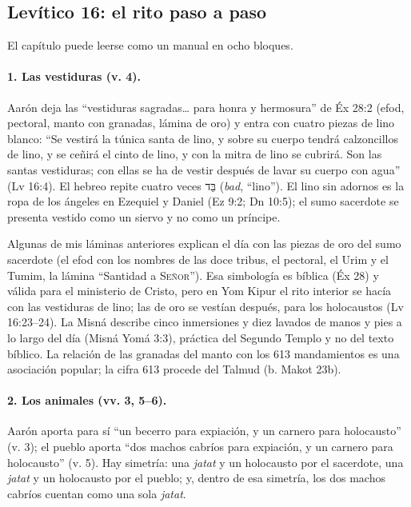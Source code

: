 \documentclass[11pt,letterpaper]{article}
\newcommand{\heb}[1]{\mbox{\foreignlanguage{hebrew}{#1}}}
\newcommand{\SENOR}{\textsc{Señor}}
\begin{document}
\subsection{Levítico 16: el rito paso a paso}
El capítulo puede leerse como un manual en ocho bloques.

\paragraph{1. Las vestiduras (v. 4).} Aarón deja las ``vestiduras sagradas\ldots{} para honra y hermosura'' de Éx 28:2 (efod, pectoral, manto con granadas, lámina de oro) y entra con cuatro piezas de lino blanco: ``Se vestirá la túnica santa de lino, y sobre su cuerpo tendrá calzoncillos de lino, y se ceñirá el cinto de lino, y con la mitra de lino se cubrirá. Son las santas vestiduras; con ellas se ha de vestir después de lavar su cuerpo con agua'' (Lv 16:4). El hebreo repite cuatro veces \heb{בַּד} (\emph{bad}, ``lino''). El lino sin adornos es la ropa de los ángeles en Ezequiel y Daniel (Ez 9:2; Dn 10:5); el sumo sacerdote se presenta vestido como un siervo y no como un príncipe.

\begin{nota}
Algunas de mis láminas anteriores explican el día con las piezas de oro del sumo sacerdote (el efod con los nombres de las doce tribus, el pectoral, el Urim y el Tumim, la lámina ``Santidad a \SENOR''). Esa simbología es bíblica (Éx 28) y válida para el ministerio de Cristo, pero en Yom Kipur el rito interior se hacía con las vestiduras de lino; las de oro se vestían después, para los holocaustos (Lv 16:23--24). La Misná describe cinco inmersiones y diez lavados de manos y pies a lo largo del día (Misná Yomá 3:3), práctica del Segundo Templo y no del texto bíblico. La relación de las granadas del manto con los 613 mandamientos es una asociación popular; la cifra 613 procede del Talmud (b. Makot 23b).
\end{nota}

\paragraph{2. Los animales (vv. 3, 5--6).} Aarón aporta para sí ``un becerro para expiación, y un carnero para holocausto'' (v. 3); el pueblo aporta ``dos machos cabríos para expiación, y un carnero para holocausto'' (v. 5). Hay simetría: una \emph{jatat} y un holocausto por el sacerdote, una \emph{jatat} y un holocausto por el pueblo; y, dentro de esa simetría, los dos machos cabríos cuentan como una sola \emph{jatat}.
\end{document}
